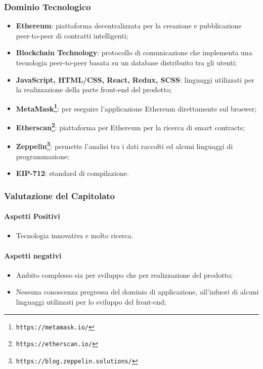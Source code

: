 \subsubsection{Dominio Tecnologico}

\begin{itemize}
  \item \textbf{Ethereum\glossario}: piattaforma decentralizzata per la creazione e pubblicazione peer-to-peer di contratti intelligenti;
  \item \textbf{Blockchain Technology\glossario}: protocollo di comunicazione che implementa una tecnologia peer-to-peer basata su un database distribuito tra gli utenti;
  \item \textbf{JavaScript, HTML/CSS, React\glossario, Redux\glossario, SCSS\glossario}: linguaggi utilizzati per la realizzazione della parte front-end del prodotto;
  \item \textbf{MetaMask\footnote{\texttt{https://metamask.io/}}\glossario}: per eseguire l'applicazione Ethereum direttamente sul broswer;
  \item \textbf{Etherscan\footnote{\texttt{https://etherscan.io/}}\glossario}: piattaforma per Ethereum per la ricerca di smart contracts;
  \item \textbf{Zeppelin\footnote{\texttt{https://blog.zeppelin.solutions/}}\glossario}: permette l'analisi tra i dati raccolti ed alcuni linguaggi di programmazione;
  \item \textbf{EIP-712}: standard di compilazione.
\end{itemize}

\subsubsection{Valutazione del Capitolato}
\paragraph{Aspetti Positivi}
\begin{itemize}
  \item Tecnologia innovativa e molto ricerca.
\end{itemize}

\paragraph{Aspetti negativi}
\begin{itemize}
  \item Ambito complesso sia per sviluppo che per realizzazione del prodotto;
  \item Nessuna conoscenza pregressa del dominio di applicazione, all'infuori di alcuni linguaggi utilizzati per lo sviluppo del front-end;
\end{itemize}

